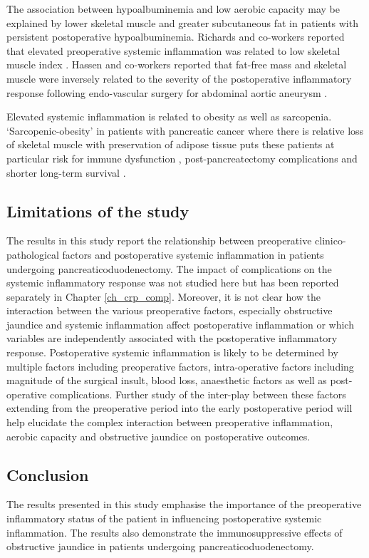 The association between hypoalbuminemia and low aerobic capacity may be explained by lower skeletal muscle and greater subcutaneous fat in patients with persistent postoperative hypoalbuminemia.
Richards and co-workers reported that elevated preoperative systemic inflammation was related to low skeletal muscle index \parencite{richards_relationships_2012}.
Hassen and co-workers reported that fat-free mass and skeletal muscle were inversely related to the severity of the postoperative inflammatory response following endo-vascular surgery for abdominal aortic aneurysm \parencite{hassen_preoperative_2007}.

Elevated systemic inflammation is related to obesity as well as sarcopenia. 
`Sarcopenic-obesity' in patients with pancreatic cancer where there is relative loss of skeletal muscle with preservation of adipose tissue puts these patients at particular risk for immune dysfunction \parencite{berg_adipose_2005, reisinger_sarcopenia_2015}, post-pancreatectomy complications \parencite{joglekar_sarcopenia_2015} and shorter long-term survival \parencite{tan_sarcopenia_2009, peng_impact_2012}.

\subsection{Limitations of the study}

The results in this study report the relationship between preoperative clinico-pathological factors and postoperative systemic inflammation in patients undergoing pancreaticoduodenectomy. 
The impact of complications on the systemic inflammatory response was not studied here but has been reported separately in Chapter \ref{ch_crp_comp}. 
Moreover, it is not clear how the interaction between the various preoperative factors, especially obstructive jaundice and systemic inflammation affect postoperative inflammation or which variables are independently associated with the postoperative inflammatory response.
Postoperative systemic inflammation is likely to be determined by multiple factors including preoperative factors, intra-operative factors including magnitude of the surgical insult, blood loss, anaesthetic factors as well as post-operative complications.
Further study of the inter-play between these factors extending from the preoperative period into the early postoperative period will help elucidate the complex interaction between preoperative inflammation, aerobic capacity and obstructive jaundice on postoperative outcomes. 

\subsection{Conclusion}
The results presented in this study emphasise the importance of the preoperative inflammatory status of the patient in influencing postoperative systemic inflammation. 
The results also demonstrate the immunosuppressive effects of obstructive jaundice in patients undergoing pancreaticoduodenectomy. 

